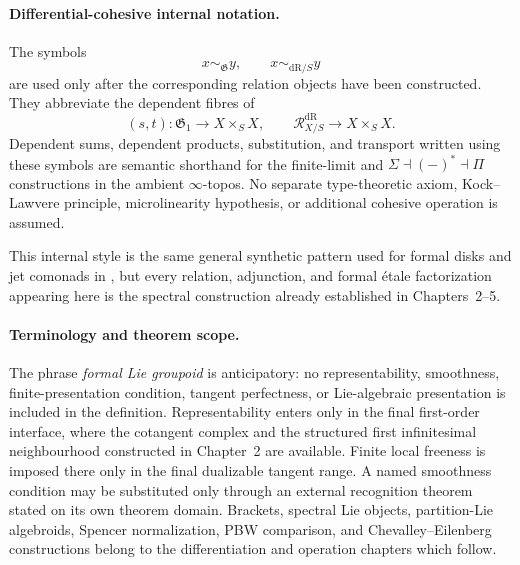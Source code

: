 \paragraph{Differential-cohesive internal notation.}
The symbols
\[
    x\sim_{\mathfrak G}y,
    \qquad
    x\sim_{\mathrm{dR}/S}y
\]
are used only after the corresponding relation objects have been constructed.
They abbreviate the dependent fibres of
\[
    (s,t):\mathfrak G_1\to X\times_SX,
    \qquad
    \mathcal R^{\mathrm{dR}}_{X/S}\to X\times_SX.
\]
Dependent sums, dependent products, substitution, and transport written using
these symbols are semantic shorthand for the finite-limit and
$\Sigma\dashv(-)^*\dashv\Pi$ constructions in the ambient
$\infty$-topos.  No separate type-theoretic axiom, Kock--Lawvere principle,
microlinearity hypothesis, or additional cohesive operation is assumed.

This internal style is the same general synthetic pattern used for formal
disks and jet comonads in \cite{KhavkineSchreiber2017}, but every relation,
adjunction, and formal \'etale factorization appearing here is the spectral
construction already established in Chapters~2--5.

\paragraph{Terminology and theorem scope.}
The phrase \emph{formal Lie groupoid} is anticipatory: no representability,
smoothness, finite-presentation condition, tangent perfectness, or
Lie-algebraic presentation is included in the definition.  Representability
enters only in the final first-order interface, where the cotangent complex
and the structured first infinitesimal neighbourhood constructed in
Chapter~2 are available.  Finite local freeness is imposed there only in the
final dualizable tangent range.  A named smoothness condition may be
substituted only through an external recognition theorem stated on its own
theorem domain.  Brackets, spectral Lie objects, partition-Lie algebroids,
Spencer normalization, PBW comparison, and Chevalley--Eilenberg constructions
belong to the differentiation and operation chapters which follow.

